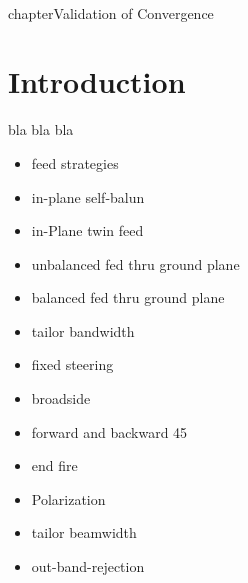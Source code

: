 \\chapter{Validation of Convergence}

\section{Introduction}

bla bla bla

\begin{itemize}
\item{feed strategies}
\item{in-plane self-balun}
\item{in-Plane twin feed}
\item{unbalanced fed thru ground plane}
\item{balanced fed thru ground plane}
\item{tailor bandwidth}
\item{fixed steering}
\item{broadside}
\item{forward and backward 45} 
\item{end fire}
\item{Polarization}
\item{tailor beamwidth}
\item{out-band-rejection}
\end{itemize}



